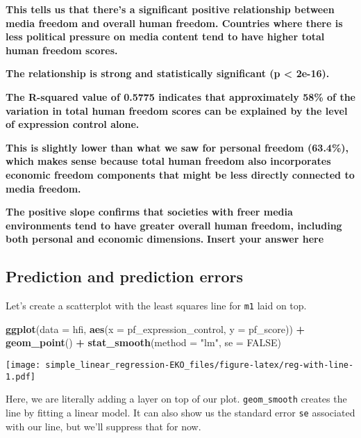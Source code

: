 \documentclass[
]{article}
\newenvironment{Shaded}{\begin{snugshade}}{\end{snugshade}}
\newcommand{\AttributeTok}[1]{\textcolor[rgb]{0.13,0.29,0.53}{#1}}
\newcommand{\ConstantTok}[1]{\textcolor[rgb]{0.56,0.35,0.01}{#1}}
\newcommand{\FunctionTok}[1]{\textcolor[rgb]{0.13,0.29,0.53}{\textbf{#1}}}
\newcommand{\NormalTok}[1]{#1}
\newcommand{\SpecialCharTok}[1]{\textcolor[rgb]{0.81,0.36,0.00}{\textbf{#1}}}
\newcommand{\StringTok}[1]{\textcolor[rgb]{0.31,0.60,0.02}{#1}}
\begin{document}
\textbf{This tells us that there's a significant positive relationship
between media freedom and overall human freedom. Countries where there
is less political pressure on media content tend to have higher total
human freedom scores.}

\textbf{The relationship is strong and statistically significant (p
\textless{} 2e-16).}

\textbf{The R-squared value of 0.5775 indicates that approximately 58\%
of the variation in total human freedom scores can be explained by the
level of expression control alone.}

\textbf{This is slightly lower than what we saw for personal freedom
(63.4\%), which makes sense because total human freedom also
incorporates economic freedom components that might be less directly
connected to media freedom.}

\textbf{The positive slope confirms that societies with freer media
environments tend to have greater overall human freedom, including both
personal and economic dimensions.} \textbf{Insert your answer here}

\subsection{Prediction and prediction
errors}\label{prediction-and-prediction-errors}

Let's create a scatterplot with the least squares line for \texttt{m1}
laid on top.

\begin{Shaded}
\begin{Highlighting}[]
\FunctionTok{ggplot}\NormalTok{(}\AttributeTok{data =}\NormalTok{ hfi, }\FunctionTok{aes}\NormalTok{(}\AttributeTok{x =}\NormalTok{ pf\_expression\_control, }\AttributeTok{y =}\NormalTok{ pf\_score)) }\SpecialCharTok{+}
  \FunctionTok{geom\_point}\NormalTok{() }\SpecialCharTok{+}
  \FunctionTok{stat\_smooth}\NormalTok{(}\AttributeTok{method =} \StringTok{"lm"}\NormalTok{, }\AttributeTok{se =} \ConstantTok{FALSE}\NormalTok{)}
\end{Highlighting}
\end{Shaded}

\texttt{[image: simple\_linear\_regression-EKO\_files/figure-latex/reg-with-line-1.pdf]}

Here, we are literally adding a layer on top of our plot.
\texttt{geom\_smooth} creates the line by fitting a linear model. It can
also show us the standard error \texttt{se} associated with our line,
but we'll suppress that for now.
\end{document}
